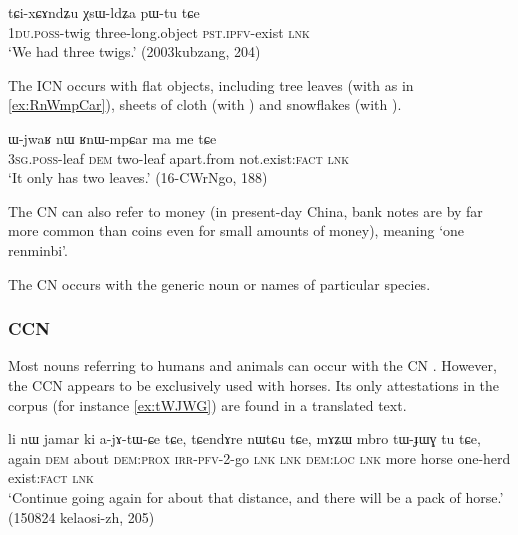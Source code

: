 \begin{exe}
\ex \label{ex:ndZu.XsWldZa}
\gll  tɕi-xɕɤndʑu χsɯ-ldʑa pɯ-tu tɕe \\
\textsc{1du}.\textsc{poss}-twig three-long.object  \textsc{pst}.\textsc{ipfv}-exist \textsc{lnk} \\
\glt `We had three twigs.'  (2003kubzang, 204)
\end{exe}

The ICN  occurs with flat objects, including tree leaves (with  as in \ref{ex:RnWmpCar}), sheets of cloth (with ) and snowflakes (with ).  

\begin{exe}
\ex \label{ex:RnWmpCar}
\gll ɯ-jwaʁ nɯ ʁnɯ-mpɕar ma me tɕe \\
\textsc{3sg}.\textsc{poss}-leaf \textsc{dem} two-leaf apart.from not.exist:\textsc{fact} \textsc{lnk} \\
\glt `It only has two leaves.'  (16-CWrNgo, 188)
\end{exe}

The CN  can also refer to money (in present-day China, bank notes are by far more common than coins even for small amounts of money), meaning `one renminbi'.

The CN  occurs with the generic noun  or names of particular species.

\subsubsection{CCN}
Most nouns referring to humans and animals can occur with the CN . However, the CCN  appears to be exclusively used with horses. Its only attestations in the corpus (for instance \ref{ex:tWJWG}) are found in a translated text.

\begin{exe}
\ex \label{ex:tWJWG}
\gll li nɯ jamar ki a-jɤ-tɯ-ɕe tɕe, tɕendɤre nɯtɕu tɕe, mɤʑɯ mbro tɯ-ɟɯɣ tu tɕe,  \\
again \textsc{dem} about \textsc{dem}:\textsc{prox} \textsc{irr}-\textsc{pfv}-2-go \textsc{lnk} \textsc{lnk} \textsc{dem}:\textsc{loc} \textsc{lnk} more horse one-herd exist:\textsc{fact} \textsc{lnk} \\
\glt `Continue going again for about that distance, and there will be a pack of horse.' (150824 kelaosi-zh, 205)
\end{exe}

